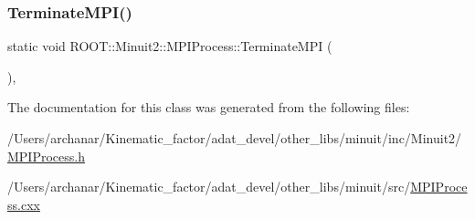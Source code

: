 \subsubsection{\texorpdfstring{TerminateMPI()}{TerminateMPI()}\hspace{0.1cm}{\footnotesize\ttfamily [2/2]}}
{\footnotesize\ttfamily static void R\+O\+O\+T\+::\+Minuit2\+::\+M\+P\+I\+Process\+::\+Terminate\+M\+PI (\begin{DoxyParamCaption}{ }\end{DoxyParamCaption})\hspace{0.3cm}{\ttfamily [inline]}, {\ttfamily [static]}}



The documentation for this class was generated from the following files\+:\begin{DoxyCompactItemize}
\item 
/\+Users/archanar/\+Kinematic\+\_\+factor/adat\+\_\+devel/other\+\_\+libs/minuit/inc/\+Minuit2/\mbox{\hyperlink{other__libs_2minuit_2inc_2Minuit2_2MPIProcess_8h}{M\+P\+I\+Process.\+h}}\item 
/\+Users/archanar/\+Kinematic\+\_\+factor/adat\+\_\+devel/other\+\_\+libs/minuit/src/\mbox{\hyperlink{MPIProcess_8cxx}{M\+P\+I\+Process.\+cxx}}\end{DoxyCompactItemize}
